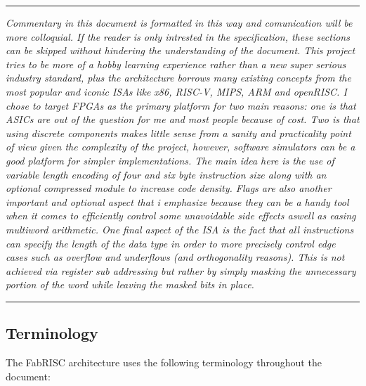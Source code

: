 \documentclass{article}
\begin{document}
    \par\noindent\rule{\textwidth}{0.4pt}
    \textit{Commentary in this document is formatted in this way and comunication will be more colloquial. If the reader is only intrested in the specification, these sections can be skipped without hindering the understanding of the document. This project tries to be more of a hobby learning experience rather than a new super serious industry standard, plus the architecture borrows many existing concepts from the most popular and iconic ISAs like x86, RISC-V, MIPS, ARM and openRISC. I chose to target FPGAs as the primary platform for two main reasons: one is that ASICs are out of the question for me and most people because of cost. Two is that using discrete components makes little sense from a sanity and practicality point of view given the complexity of the project, however, software simulators can be a good platform for simpler implementations. The main idea here is the use of variable length encoding of four and six byte instruction size along with an optional compressed module to increase code density. Flags are also another important and optional aspect that i emphasize because they can be a handy tool when it comes to efficiently control some unavoidable side effects aswell as easing multiword arithmetic. One final aspect of the ISA is the fact that all instructions can specify the length of the data type in order to more precisely control edge cases such as overflow and underflows (and orthogonality reasons). This is not achieved via register sub addressing but rather by simply masking the unnecessary portion of the word while leaving the masked bits in place.}
    \par\noindent\rule{\textwidth}{0.4pt}

    \subsection[Terminology]{Terminology}

        The FabRISC architecture uses the following terminology throughout the document:
\end{document}

